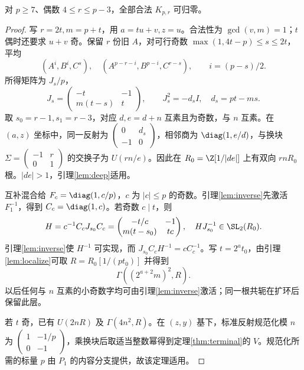 \begin{lemma}\label{lem:even-core}
对 $p\ge7$、偶数 $4\le r\le p-3$，全部合法 $K_{p,r}$ 可归零。
\end{lemma}
\begin{proof}
写 $r=2t,m=p+t$，用 $a=tu+v,z=u$。合法性为 $\gcd(v,m)=1$；$t$ 偶时还要求 $u+v$ 奇。保留 $r$ 份旧 $A$，对可行奇数 $\max(1,4t-p)\le s\le2t$，平均
\begin{equation}\label{eq:even-reflection}
(A^i,B^i,C^s),\quad(A^{p-r-i},B^{p-i},C^{r-s}),\qquad i=(p-s)/2.
\end{equation}
所得矩阵为 $J_s/p$，
\[
J_s=\begin{pmatrix}-t&-1\\m(t-s)&t\end{pmatrix},\qquad
J_s^2=-d_sI,\quad d_s=pt-ms.
\]
取 $s_0=r-1,s_1=r-3$，对应 $d,e=d+n$ 互素且为奇数，与 $n$ 互素。在 $(a,z)$ 坐标中，同一反射为 $\left(\begin{smallmatrix}0&d_s\\-1&0\end{smallmatrix}\right)$，相邻商为 $\diag(1,e/d)$，与换块 $\Sigma=\left(\begin{smallmatrix}-1&r\\0&1\end{smallmatrix}\right)$ 的交换子为 $U(rn/e)$。因此在 $R_0=\Z[1/|de|]$ 上有双向 $rnR_0$ 根。$|de|>1$，引理\ref{lem:deep}适用。

互补混合给 $F_c=\diag(1,c/p)$，$c$ 为 $|c|\le p$ 的奇数。引理\ref{lem:inverse}先激活 $F_1^{-1}$，得到 $C_c=\diag(1,c)$。若奇数 $c\mid t$，则
\[
H=c^{-1}C_cJ_{s_0}C_c
=\begin{pmatrix}-t/c&-1\\m(t-s_0)&tc\end{pmatrix},\quad
HJ_{s_0}^{-1}\in\SL_2(R_0).
\]
引理\ref{lem:inverse}使 $H^{-1}$ 可实现，而 $J_{s_0}C_cH^{-1}=cC_c^{-1}$。写 $t=2^a t_0$，由引理\ref{lem:localize}可取 $R=R_0[1/(pt_0)]$ 并得到
\begin{equation}\label{eq:even-deep}
\Gamma((2^{a+2}m)^2,R).
\end{equation}
以后任何与 $n$ 互素的小奇数字均可由引理\ref{lem:inverse}激活；同一根共轭在扩环后保留此层。

若 $t$ 奇，已有 $U(2nR)$ 及 $\Gamma(4n^2,R)$。在 $(z,y)$ 基下，标准反射规范化模 $n$ 为 $\left(\begin{smallmatrix}1&-1/p\\0&-1\end{smallmatrix}\right)$，乘换块后取适当整数幂得到定理\ref{thm:terminal}的 $V$。规范化所需的标量 $p$ 由 $P_1$ 的内容分支提供，故该定理适用。


\end{proof}
